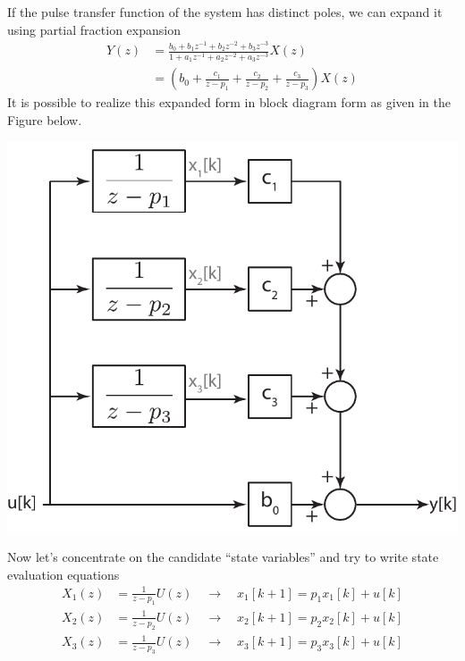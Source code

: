 \documentclass[twoside]{article}
\begin{document}
If the pulse transfer function of the system 
has distinct poles, we can expand it 
using partial fraction expansion 
%
\begin{align*}
Y(z) &= \frac{b_0 + b_1 z^{-1} + b_2 z^{-2} + b_3 z^{-3}}{1+ a_1
       z^{-1} + a_2 z^{-2} + a_3 z^{-3}} X(z)
\\
&= \left( b_0 + \frac{c_1}{z - p_1} + \frac{c_2}{z - p_2}
+ \frac{c_3}{z - p_3} \right) X(z)
\end{align*}
%
It is possible to realize this expanded form in block diagram 
form as given in the Figure below.
%
     \begin{center}
 \begin{minipage}[h]{0.5\linewidth}
     \begin{center}
       \includegraphics[width=\textwidth]{diagonal}
     \end{center}
 \end{minipage}
     \end{center}
%
Now let's concentrate on the candidate ``state variables''
and try to write state evaluation equations
%
\begin{align*}
X_1(z) &= \frac{1}{z - p_1} U(z) \quad \rightarrow \quad x_1[k+1] = p_1
  x_1[k] + u[k]
\\
X_2(z) &= \frac{1}{z - p_2} U(z) \quad \rightarrow \quad x_2[k+1] = p_2
  x_2[k] + u[k]
\\
X_3(z) &= \frac{1}{z - p_3} U(z) \quad \rightarrow \quad x_3[k+1] = p_3
  x_3[k] + u[k]
\end{align*}
\end{document}
